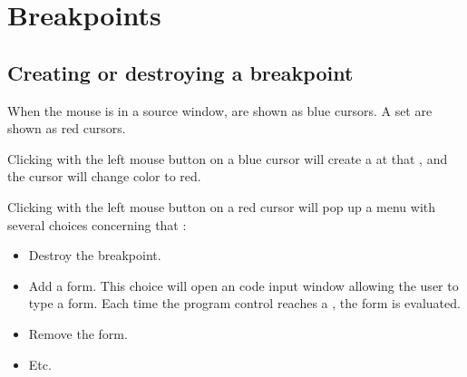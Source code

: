 \chapter{Breakpoints}

\section{Creating or destroying a breakpoint}

When the mouse is in a source window, \pollpoint{} are shown as blue
cursors.  A \breakpoint{} set are shown as red cursors.

Clicking with the left mouse button on a blue cursor will create a
\breakpoint{} at that \pollpoint{}, and the cursor will change color
to red.

Clicking with the left mouse button on a red cursor will pop up a menu
with several choices concerning that \breakpoint{}:

\begin{itemize}
\item Destroy the breakpoint.
\item Add a form.  This choice will open an code input window
  allowing the user to type a form.  Each time the program control
  reaches a \breakpoint{}, the form is evaluated.
\item Remove the form.
\item Etc.
\end{itemize}
